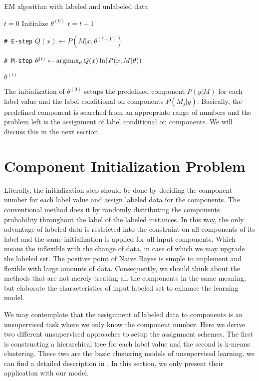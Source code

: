 \begin{algorithm}[H]
	\caption{EM algorithm with labeled and unlabeled data}
	\begin{algorithmic}[1]
		\State $t = 0$
		\State Initialize $\theta^{(0)}$
		\Repeat
		\State $t = t + 1$
		
		\State \texttt{\# E-step}
		\State $Q(x) \gets P(M | x, \theta^{(t-1)})$ 
						
		\State \texttt{\# M-step}
		\State $\theta^{(t)} \gets \operatorname{argmax}_{\theta} 
		{Q(x) \ln(P(x, M | \theta))}$ 
		
		
		\State \Return $\theta^{(t)}$
		\EndFunction
	\end{algorithmic}
	\label{alg2: EM algorithm}
\end{algorithm}

The initialization of $\theta^{(0)}$ setups the predefined component $P(y|M)$ for each label value and the label conditional on components $P(M_j|y)$. Basically, the predefined component is searched from an appropriate range of numbers and the problem left is the assignment of label conditional on components. We will discuss this in the next section.

\section{Component Initialization Problem}
Literally, the initialization step should be done by deciding the component number for each label value and assign labeled data for the components. The conventional method does it by randomly distributing the components probability throughout the label of the labeled instances. In this way, the only advantage of labeled data is restricted into the constraint on all components of its label and the same initialization is applied for all input components. Which means the inflexible with the change of data, in case of which we may upgrade the labeled set. The positive point of Naive Bayes is simple to implement and flexible with large amounts of data. Consequently, we should think about the methods that are not merely treating all the components in the same meaning, but elaborate the characteristics of input labeled set to enhance the learning model.

We may contemplate that the assignment of labeled data to components is an unsupervised task where we only know the component number. Here we derive two different unsupervised approaches to setup the assignment schemes. The first is constructing a hierarchical tree for each label value and the second is k-means clustering. These two are the basic clustering models of unsupervised learning, we can find a detailed description in \parencite{Manning:2008:IIR:1394399}. In this section, we only present their application with our model.

